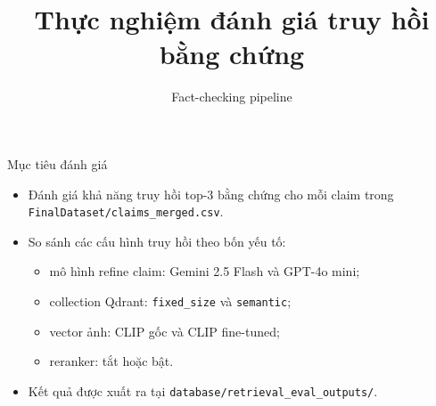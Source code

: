 \documentclass[aspectratio=169]{beamer}
\title[Đánh giá truy hồi bằng chứng]{Thực nghiệm đánh giá truy hồi bằng chứng}
\subtitle{Fact-checking pipeline}
\author{}
\date{}
\begin{document}
\begin{frame}
  \titlepage
\end{frame}

\begin{frame}{Mục tiêu đánh giá}
  \begin{itemize}
    \item Đánh giá khả năng truy hồi top-3 bằng chứng cho mỗi claim trong \texttt{FinalDataset/claims\_merged.csv}.
    \item So sánh các cấu hình truy hồi theo bốn yếu tố:
    \begin{itemize}
      \item mô hình refine claim: Gemini 2.5 Flash và GPT-4o mini;
      \item collection Qdrant: \texttt{fixed\_size} và \texttt{semantic};
      \item vector ảnh: CLIP gốc và CLIP fine-tuned;
      \item reranker: tắt hoặc bật.
    \end{itemize}
    \item Kết quả được xuất ra tại \texttt{database/retrieval\_eval\_outputs/}.
  \end{itemize}
\end{frame}
\end{document}
